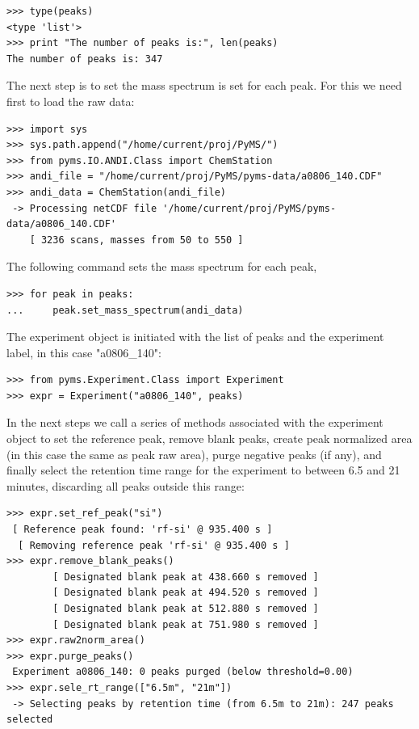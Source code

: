 \begin{verbatim}
>>> type(peaks)
<type 'list'>
>>> print "The number of peaks is:", len(peaks)
The number of peaks is: 347
\end{verbatim}

The next step is to set the mass spectrum is set for each peak. For this we need
first to load the raw data:

\begin{verbatim}
>>> import sys
>>> sys.path.append("/home/current/proj/PyMS/")
>>> from pyms.IO.ANDI.Class import ChemStation
>>> andi_file = "/home/current/proj/PyMS/pyms-data/a0806_140.CDF"
>>> andi_data = ChemStation(andi_file)
 -> Processing netCDF file '/home/current/proj/PyMS/pyms-data/a0806_140.CDF'
    [ 3236 scans, masses from 50 to 550 ]
\end{verbatim}

\noindent
The following command sets the mass spectrum for each peak,

\begin{verbatim}
>>> for peak in peaks:
...     peak.set_mass_spectrum(andi_data)
\end{verbatim}

The experiment object is initiated with the list of peaks and the experiment
label, in this case "a0806\_140":

\begin{verbatim}
>>> from pyms.Experiment.Class import Experiment
>>> expr = Experiment("a0806_140", peaks)
\end{verbatim}

\noindent
In the next steps we call a series of methods associated with the experiment
object to set the reference peak, remove blank peaks, create peak normalized
area (in this case the same as peak raw area), purge negative peaks (if
any), and finally select the retention time range for the experiment to
between 6.5 and 21 minutes, discarding all peaks outside this range:

\begin{verbatim}
>>> expr.set_ref_peak("si")
 [ Reference peak found: 'rf-si' @ 935.400 s ]
  [ Removing reference peak 'rf-si' @ 935.400 s ]
>>> expr.remove_blank_peaks()
        [ Designated blank peak at 438.660 s removed ]
        [ Designated blank peak at 494.520 s removed ]
        [ Designated blank peak at 512.880 s removed ]
        [ Designated blank peak at 751.980 s removed ]
>>> expr.raw2norm_area()
>>> expr.purge_peaks()
 Experiment a0806_140: 0 peaks purged (below threshold=0.00)
>>> expr.sele_rt_range(["6.5m", "21m"])
 -> Selecting peaks by retention time (from 6.5m to 21m): 247 peaks selected
\end{verbatim}

